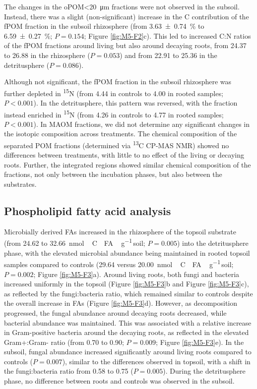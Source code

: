 The changes in the oPOM<\SI{20}{\micro\metre} fractions were not observed in the subsoil. Instead, there was a slight (non-significant) increase in the C contribution of the fPOM fraction in the subsoil rhizosphere (from \SI{3.63 \pm 0.74}{\percent} to \SI{6.59 \pm 0.27}{\percent}; \(P=0.154\); Figure \ref{fig:M5-F2}c). This led to increased C:N ratios of the fPOM fractions around living but also around decaying roots, from \num{24.37} to \num{26.88} in the rhizosphere (\(P=0.053\)) and from \num{22.91} to \num{25.36} in the detritusphere (\(P=0.086\)).

Although not significant, the fPOM fraction in the subsoil rhizosphere was further depleted in \textsuperscript{15}N (from \num{4.44} in controls to \SI{4.00}{\permil} in rooted samples; \(P < 0.001\)). In the detritusphere, this pattern was reversed, with the fraction instead enriched in \textsuperscript{15}N (from \num{4.26} in controls to \SI{4.77}{\permil} in rooted samples; \(P < 0.001\)). In MAOM fractions, we did not determine any significant changes in the isotopic composition across treatments. The chemical composition of the separated POM fractions (determined via \textsuperscript{13}C CP-MAS NMR) showed no differences between treatments, with little to no effect of the living or decaying roots. Further, the integrated regions showed similar chemical composition of the fractions, not only between the incubation phases, but also between the substrates.

\subsection{Phospholipid fatty acid analysis}

Microbially derived FAs increased in the rhizosphere of the topsoil substrate (from \num{24.62} to \SI{32.66}{nmol\,C\text{-}FA\,\gram^{-1}}\,soil; \(P=0.005\)) into the detritusphere phase, with the elevated microbial abundance being maintained in rooted topsoil samples compared to controls (\num{29.64} versus \SI{20.00}{nmol\,C\text{-}FA\,\gram^{-1}}\,soil; \(P=0.002\); Figure \ref{fig:M5-F3}a). Around living roots, both fungi and bacteria increased uniformly in the topsoil (Figure \ref{fig:M5-F3}b and Figure \ref{fig:M5-F3}c), as reflected by the fungi:bacteria ratio, which remained similar to controls despite the overall increase in FAs (Figure \ref{fig:M5-F3}d). However, as decomposition progressed, the fungal abundance around decaying roots decreased, while bacterial abundance was maintained. This was associated with a relative increase in Gram-positive bacteria around the decaying roots, as reflected in the elevated Gram+:Gram- ratio (from \num{0.70} to \num{0.90}; \(P=0.009\); Figure \ref{fig:M5-F3}e). In the subsoil, fungal abundance increased significantly around living roots compared to controls (\(P=0.007\)), similar to the differences observed in topsoil, with a shift in the fungi:bacteria ratio from \num{0.58} to \num{0.75} (\(P=0.005\)). During the detritusphere phase, no difference between roots and controls was observed in the subsoil.


